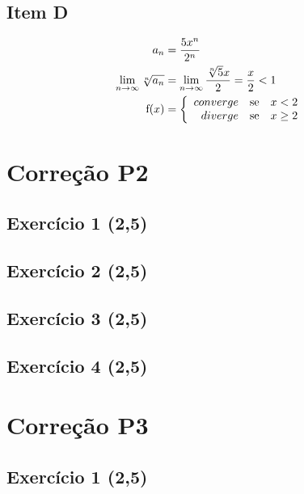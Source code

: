 \documentclass[12pt,openany, letterpaper]{book}
\newcommand{\LI}[1][n]{\lim_{{#1} \rightarrow \infty}}
\newcommand{\E}[1]{Exercício #1}
\newcommand{\IT}[1]{Item {#1}}
\begin{document}
{{\begin{multicols}{2}
\section*{\IT{D}}\begin{align*}
a_n &= {5x^n \over 2^n} \\
\LI \sqrt[n]{a_n} &= \LI {\sqrt[n]{5} x \over 2} = {x \over 2} < 1 \\
\hbox{f}(x)
&= \left\{ \begin{array}{rll}
converge & \hbox{se} &  x < 2 \\
diverge & \hbox{se} &  x \geq 2 \\
\end{array}\right.
\end{align*}

\end{multicols}

\chapter{Correção P2}
\label{C:P2}

\section*{\E{1} (2,5)}

\newpage

\section*{\E{2} (2,5)}

\newpage

\section*{\E{3} (2,5)}

\newpage

\section*{\E{4} (2,5)}

\chapter{Correção P3}
\label{C:P3}

\section*{\E{1} (2,5)}

}}
\end{document}
